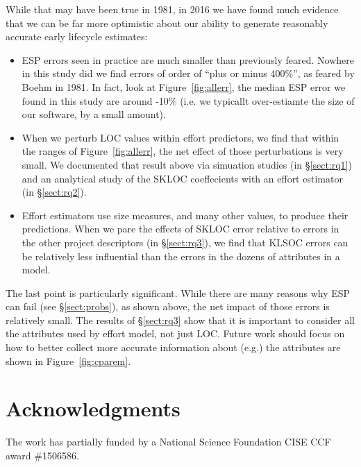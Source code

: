 \documentclass[final,twocolumn,5p]{elsarticle}
\newcommand{\bi}{\begin{itemize}[leftmargin=0.4cm]}
\newcommand{\ei}{\end{itemize}}
\newcommand{\tion}[1]{\S\ref{sect:#1}}
\newcommand{\fig}[1]{Figure~\ref{fig:#1}}
\theoremstyle{break}
\begin{document}
While that may have been true in 1981, in 2016 we have found much evidence that we can be far more optimistic about
our ability to generate reasonably accurate early lifecycle estimates:
\bi
\item
ESP errors seen in practice are much smaller than previously feared. Nowhere in
this study did we find errors of order of ``plus or minus 400\%'', as feared
by Boehm in 1981. In fact, look at \fig{allerr}, the median ESP error we found in
this study are around -10\% (i.e. we typicallt over-estiamte the size of our software, by a small amount).
\item
When we perturb LOC values within effort predictors, we find that within the ranges
of \fig{allerr}, the net effect of those perturbations is very small. We documented that result above via simuation studies (in \tion{rq1}) and an analytical study of the SKLOC coeffecients with an effort estimator (in \tion{rq2}).
\item
Effort estimators
use size measures, and many other values, to produce their predictions.  When we
pare the effects of SKLOC error relative to errors in the other project
descriptors (in \tion{rq3}), we find that KLSOC errors can be relatively less 
influential than the errors in the dozens of attributes in a model.
\ei
The last point is particularly significant. While there are many reasons why ESP can fail (see \tion{probs}),
as shown above, the net impact of those errors is relatively small. The results of \tion{rq3}
show that it is important to consider all the attributes used by  effort model, not just LOC.  
Future work should focus on how to better collect more accurate information about (e.g.)
the attributes are shown in \fig{cparem}.  

\section*{Acknowledgments}
The work has partially funded by a National Science Foundation CISE CCF award \#1506586.
 
\vspace*{0.5mm}
 
 
% 

  

   



 
    
\end{document}
